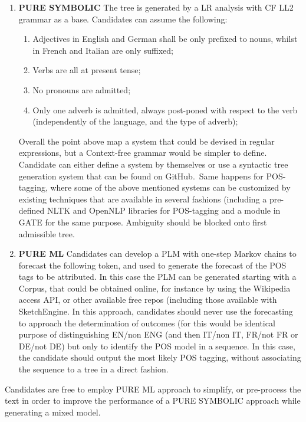 \documentclass{article}
\begin{document}
    \begin{enumerate}
        \item \textbf{PURE SYMBOLIC} The tree is generated by a LR analysis with CF LL2 grammar as a base. Candidates can assume the following:
            \begin{enumerate}
                \item Adjectives in English and German shall be only prefixed to nouns, whilst in French and Italian are only suffixed;
                \item Verbs are all at present tense;
                \item No pronouns are admitted;
                \item Only one adverb is admitted, always post-poned with respect to the verb (independently of the language, and the type of adverb);
            \end{enumerate}
            Overall the point above map a system that could be devised in regular expressions, but a Context-free grammar would be simpler to define. Candidate can either define a system by themselves or use a syntactic tree generation system that can be found on GitHub.\
            Same happens for POS-tagging, where some of the above mentioned systems can be customized by existing techniques that are available in several fashions (including a pre-defined NLTK and OpenNLP libraries for POS-tagging and a module in GATE for the same purpose. Ambiguity should be blocked onto first admissible tree.
        \item \textbf{PURE ML} Candidates can develop a PLM with one-step Markov chains to forecast the following token, and used to generate the forecast of the POS tags to be attributed. In this case the PLM can be generated starting with a Corpus, that could be obtained online, for instance by using the Wikipedia access API, or other available free repos (including those available with SketchEngine. In this approach, candidates should
        never use the forecasting to approach the determination of outcomes (for this would be identical purpose of distinguishing EN/non ENG (and then IT/non IT, FR/not FR or DE/not DE) but only to identify the POS model in a sequence. In this case, the candidate should output the most
        likely POS tagging, without associating the sequence to a tree in a direct fashion.    
    \end{enumerate} 
    Candidates are free to employ PURE ML approach to simplify, or pre-process the text in order to improve the performance of a PURE SYMBOLIC approach while generating a mixed model.
\end{document}
